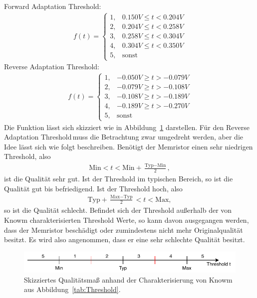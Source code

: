   Forward Adaptation Threshold:
  \begin{align}
    f(t) = \begin{cases}
              1, & 0.150V \leq t < 0.204V \\
              2, & 0.204V \leq t < 0.258V\\
              3, & 0.258V \leq t < 0.304V\\
              4, & 0.304V \leq t < 0.350V\\
              5, & \text{sonst}
            \end{cases}\label{forward_threshold}
  \end{align}
  Reverse Adaptation Threshold:
  \begin{align}
    f(t) = \begin{cases}
              1, & -0.050V \geq t > -0.079V \\
              2, & -0.079V \geq t > -0.108V\\
              3, & -0.108V \geq t > -0.189V\\
              4, & -0.189V \geq t > -0.270V\\
              5, & \text{sonst}
           \end{cases}\label{reverse_threshold}
  \end{align}
  Die Funktion lässt sich skizziert wie in Abbildung~\ref{fig:Threshold_Char} darstellen. Für den \glqq Reverse Adaptation Threshold\grqq\,muss die Betrachtung zwar umgedreht werden, aber die Idee lässt sich wie folgt beschreiben. Benötigt der Memristor einen sehr niedrigen Threshold, also
  \begin{align*}
    \text{Min} < t < \text{Min} + \frac{\text{Typ} - \text{Min}}{2},
  \end{align*}
  ist die Qualität sehr gut. Ist der Threshold im typischen Bereich, so ist die Qualität gut bis befriedigend. Ist der Threshold hoch, also
  \begin{align*}
    \text{Typ} + \frac{\text{Max} - \text{Typ}}{2} < t < \text{Max},
  \end{align*}
  so ist die Qualität schlecht. Befindet sich der Threshold außerhalb der von Knowm charakterisierten Threshold Werte, so kann davon ausgegangen werden, dass der Memristor beschädigt oder zumindestens nicht mehr Originalqualität besitzt. Es wird also angenommen, dass er eine sehr schlechte Qualität besitzt.

  \begin{figure}[h]
    \includegraphics[width=\textwidth]{images/Threshold_Kategorisierung.pdf}
    \caption{Skizziertes Qualitätsmaß anhand der Charakterisierung von Knowm aus Abbildung~\ref{tab:Threshold}.}
    \label{fig:Threshold_Char}
  \end{figure}


